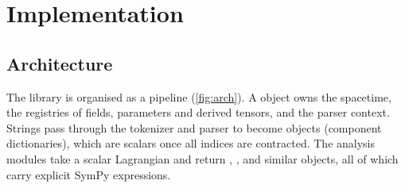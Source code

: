 \section{Implementation}
\label{sec:impl}

\subsection{Architecture}
\label{sec:arch}

The library is organised as a pipeline (\cref{fig:arch}). A  object owns the spacetime, the registries of fields, parameters and derived tensors, and the parser context. Strings pass through the tokenizer and parser to become  objects (component dictionaries), which are scalars once all indices are contracted. The analysis modules take a scalar Lagrangian and return , ,  and similar objects, all of which carry explicit SymPy expressions.

